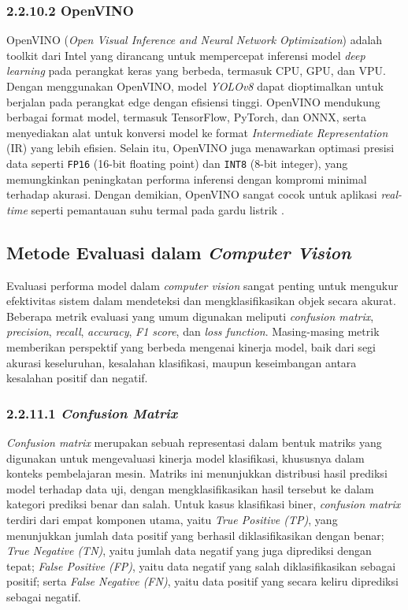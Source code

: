 \subsubsection{2.2.10.2 OpenVINO}
OpenVINO (\emph{Open Visual Inference and Neural Network Optimization}) adalah toolkit dari Intel yang dirancang untuk mempercepat inferensi model \emph{deep learning} pada perangkat keras yang berbeda, termasuk CPU, GPU, dan VPU. Dengan menggunakan OpenVINO, model \emph{YOLOv8} dapat dioptimalkan untuk berjalan pada perangkat edge dengan efisiensi tinggi. OpenVINO mendukung berbagai format model, termasuk TensorFlow, PyTorch, dan ONNX, serta menyediakan alat untuk konversi model ke format \emph{Intermediate Representation} (IR) yang lebih efisien. Selain itu, OpenVINO juga menawarkan optimasi presisi data seperti \texttt{FP16} (16-bit floating point) dan \texttt{INT8} (8-bit integer), yang memungkinkan peningkatan performa inferensi dengan kompromi minimal terhadap akurasi. Dengan demikian, OpenVINO sangat cocok untuk aplikasi \emph{real-time} seperti pemantauan suhu termal pada gardu listrik \cite{openvino2021toolkit}.

\subsection{Metode Evaluasi dalam \emph{Computer Vision}}

Evaluasi performa model dalam \emph{computer vision} sangat penting untuk mengukur efektivitas sistem dalam mendeteksi dan mengklasifikasikan objek secara akurat. Beberapa metrik evaluasi yang umum digunakan meliputi \emph{confusion matrix}, \emph{precision}, \emph{recall}, \emph{accuracy}, \emph{F1 score}, dan \emph{loss function}. Masing-masing metrik memberikan perspektif yang berbeda mengenai kinerja model, baik dari segi akurasi keseluruhan, kesalahan klasifikasi, maupun keseimbangan antara kesalahan positif dan negatif.

\subsubsection{2.2.11.1 \emph{Confusion Matrix}}
\emph{Confusion matrix} merupakan sebuah representasi dalam bentuk matriks yang digunakan untuk mengevaluasi kinerja model klasifikasi, khususnya dalam konteks pembelajaran mesin. Matriks ini menunjukkan distribusi hasil prediksi model terhadap data uji, dengan mengklasifikasikan hasil tersebut ke dalam kategori prediksi benar dan salah. Untuk kasus klasifikasi biner, \emph{confusion matrix} terdiri dari empat komponen utama, yaitu \emph{True Positive (TP)}, yang menunjukkan jumlah data positif yang berhasil diklasifikasikan dengan benar; \emph{True Negative (TN)}, yaitu jumlah data negatif yang juga diprediksi dengan tepat; \emph{False Positive (FP)}, yaitu data negatif yang salah diklasifikasikan sebagai positif; serta \emph{False Negative (FN)}, yaitu data positif yang secara keliru diprediksi sebagai negatif.




